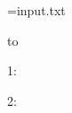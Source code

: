 \documentclass{article}
\makeatletter
\def\goSantaGo#1{%
  \expandafter\@goSantaGo#1\relax
}
\def\@goSantaGo#1{%
  \advance\idx by1
  \ifx\relax#1%
  \else
    \if #1)%
      \advance\floor by-1
    \else
      \advance\floor by1
    \fi
    \ifnum\floor<0
      \ifnum\basement=-1
        \basement=\idx
      \fi
    \fi
    \expandafter\@goSantaGo
  \fi
}
\makeatother
\begin{document}
\newread\myfile
\openin\myfile=input.txt

\newtoks\filecontent
\read\myfile to \filecontent

\closein\myfile

\newcount\floor
{}
\newcount\idx
\newcount\basement
{}

\goSantaGo{\filecontent}

1: \the\floor

2: \the\basement
\end{document}

